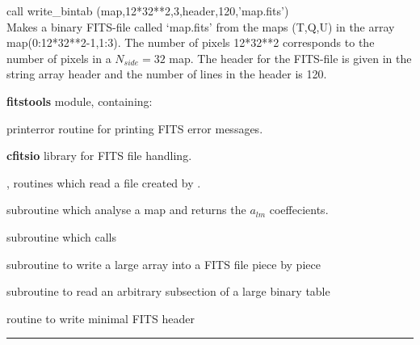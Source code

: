 \begin{example}
{
call write\_bintab (map,12*32**2,3,header,120,'map.fits')  \\
}
{
Makes a binary FITS-file called `map.fits' from the \healpix maps (T,Q,U) in the array map(0:12*32**2-1,1:3). The number of pixels 12*32**2 corresponds to the number of pixels in a $N_{side}=32$ \healpix map. The header for the FITS-file is given in the string array header and the number of lines in the header is 120. 
}
\end{example}
\begin{modules}
  \begin{sulist}{} %
  \item[\textbf{fitstools}] module, containing:
  \item[printerror] routine for printing FITS error messages.
  \item[\textbf{cfitsio}] library for FITS file handling.		
  \end{sulist}
\end{modules}

\begin{related}
  \begin{sulist}{} %
  \item[\htmlref{input\_map}{sub:input_map}, \htmlref{read\_bintab}{sub:read_bintab}] routines which read a file created by \thedocid. 
  \item[\htmlref{map2alm}{sub:map2alm}] subroutine which analyse a map and returns the $a_{lm}$ coeffecients.
  \item[\htmlref{output\_map}{sub:output_map}] subroutine which calls \thedocid
  \item[\htmlref{write\_bintabh}{sub:write_bintabh}] subroutine to write a large
array into a FITS file piece by piece
  \item[\htmlref{input\_tod*}{sub:input_tod}] subroutine to read an arbitrary subsection of
  a large binary table
  \item[\htmlref{write\_minimal\_header}{sub:write_minimal_header}] routine to write minimal FITS header\end{sulist}
\end{related}

\rule{\hsize}{2mm}

\newpage
